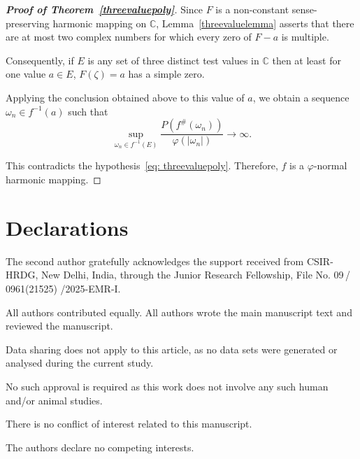 \documentclass[11pt, reqno]{amsart}
\numberwithin{equation}{section}
\theoremstyle{definition}
\theoremstyle{remark}
\theoremstyle{plain}
\begin{document}
\begin{proof}[\bf{Proof of Theorem~\ref{threevaluepoly}}]
Since $F$ is a non-constant sense-preserving harmonic mapping on
$\mathbb{C}$, Lemma~\ref{threevaluelemma} asserts that
 there are at most two complex
numbers for which every zero of $F-a$ is multiple.

Consequently, if $E$ is any set of three distinct test values in $\mathbb{C}$
then at least for one value $a\in E$,
$F(\zeta)=a$ has a simple zero.

Applying the conclusion obtained above to this value of $a$, we obtain 
a sequence $\omega_n \in f^{-1}(a)$ such that
\[
\sup_{\omega_n\in f^{-1}(E)}
\frac{P\!\left(f^{\#}(\omega_n)\right)}
{\varphi(|\omega_n|)}
\longrightarrow \infty.
\]

This contradicts the hypothesis~\eqref{eq: threevaluepoly}. Therefore,
 $f$ is a $\varphi$-normal harmonic mapping.
\end{proof}


\section*{Declarations}
\quad The second author gratefully acknowledges
 the support received from CSIR-HRDG, New Delhi, India, through the 
Junior Research Fellowship, File No. 09\,/\,0961(21525) /2025-EMR-I.
\smallskip

 \quad  All authors contributed equally.
 All authors wrote the main manuscript text
 and reviewed the manuscript.
\medskip



 \quad  Data sharing does not apply to 
this article, as no data sets
were generated or analysed during the current study.
\medskip


 \quad No such approval is required as this 
work does not involve any such human and/or animal
studies.
\smallskip

\quad  There is no conflict of interest 
related to this manuscript.
\smallskip

 \quad The authors declare no
 competing interests.
\end{document}
